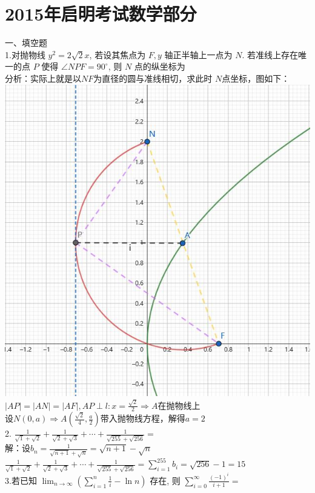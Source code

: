 \documentclass[a4paper,11pt,UTF8]{article}
\begin{document}
\section*{2015年启明考试数学部分}
\noindent
一、填空题\\
1.对抛物线 $y^2=2 \sqrt{2} x$, 若设其焦点为 $F, y$ 轴正半轴上一点为 $N$. 若准线上存在唯一的点 $P$ 使得 $\angle N P F=90^{\circ}$, 则 $N$ 点的纵坐标为\\
分析：实际上就是以$NF$为直径的圆与准线相切，求此时 $N$点坐标，图如下：\\
\includegraphics[scale=0.5]{./2015_1.jpg}\\
$|AP|=|AN|=|AF|,AP\perp l: x= \frac{\sqrt{2}}{2}\Rightarrow A$在抛物线上\\
设$\displaystyle N(0,a)\Rightarrow A(\frac{\sqrt{2}}{4},\frac{a}{2})$带入抛物线方程，解得$a=2$\\
2. $\displaystyle\frac{1}{\sqrt{1}+\sqrt{2}}+\frac{1}{\sqrt{2}+\sqrt{3}}+\cdots+\frac{1}{\sqrt{255}+\sqrt{256}}=$\\
解：设$\displaystyle b_n=\frac{1}{\sqrt{n+1}+\sqrt{n}}=\sqrt{n+1}-\sqrt{n}$\\
$\displaystyle\frac{1}{\sqrt{1}+\sqrt{2}}+\frac{1}{\sqrt{2}+\sqrt{3}}+\cdots+\frac{1}{\sqrt{255}+\sqrt{256}}=\sum_{i=1}^{255}b_i=\sqrt{256}-1=15$\\
3.若已知 $\displaystyle\lim _{n \rightarrow\infty}\left(\sum_{i=1}^n \frac{1}{i}-\ln n\right)$ 存在, 则 $\displaystyle\sum_{i=0}^{\infty} \frac{(-1)^{i}}{i+1}=$\\
\end{document}
